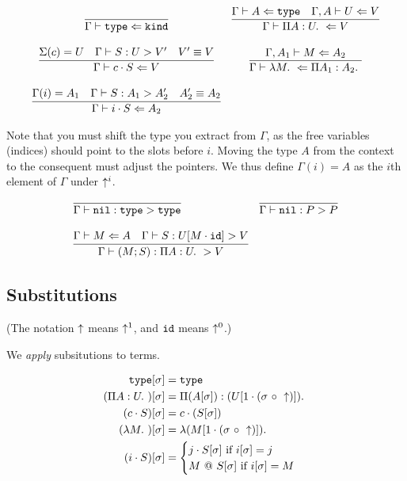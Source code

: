 \bigskip 
{}
\bigskip 

$$
\begin{array}{cc}
\infer{\CheckTy{\Type}{\Kind}}{} &
\infer{\CheckTy{\PiTyp{A}{U}}{V}}{\CheckTy{A}{\Type} & \CheckTy[\Gamma,A]{U}{V}}\\\\
\infer{\CheckTy{c\cdot S}{V}}{\Sigma(c) = U & \Focus{S}{U}{V'} & \Equiv{V'}{V}} &
\infer{\CheckTy{\Lam{M}}{\PiTyp{A_1}{A_2}}}{\CheckTy[\Gamma,A_1]{M}{A_2}} \\\\
\infer{\CheckTy{i\cdot S}{A_2}}{\Gamma(i)=A_1 & \Focus{S}{A_1}{A_2'} & \Equiv{A_2'}{A_2}}
\end{array} 
$$

\bigskip 

\begin{Note}\label{context:shift} 
Note that you must shift the type you extract from $\Gamma$, as the
free variables (indices) should point to the slots before $i$.  Moving
the type $A$ from the context to the consequent must adjust the pointers.
We thus define $\Gamma(i) = A$ as the $i$th element of $\Gamma$
under $\uparrow^i$.
\end{Note} 

\bigskip 
{}
\bigskip 

$$
\begin{array}{lr}
\infer{\Focus{\Nil}{\Type}{\Type}}{} & 
\infer{\Focus{\Nil}{P}{P}}{} \\\\
\infer{\Focus{(M;S)}{\PiTyp{A}{U}}{V}}{\CheckTy{M}{A} & \Focus{S}{U[M\cdot\IdSub]}{V}}
\end{array} 
$$


\subsection{Substitutions}

(The notation $\uparrow$ means $\uparrow^1$, and $\mathtt{id}$ means $\uparrow^0$.)  

We \emph{apply} subsitutions to terms.

\bigskip
{}

\begin{align*} 
\mathtt{type}[\sigma] &= \mathtt{type} \\
(\Pi A : U.\ )[\sigma] &= \Pi (A[\sigma]) : (U[1\cdot(\sigma~\circ~\uparrow)]).\ \\
(c\cdot S)[\sigma] &= c\cdot (S[\sigma]) \\
(\lambda M.\ )[\sigma] &= \lambda (M[1\cdot(\sigma~\circ~\uparrow)]).\ \\
(i\cdot S)[\sigma] &= \begin{cases}
                     j\cdot S[\sigma] \mbox{\ if $i[\sigma] = j$} \\
                     M ~@~ S[\sigma]\mbox{\ if $i[\sigma] = M$}
                   \end{cases} 
\end{align*} 




